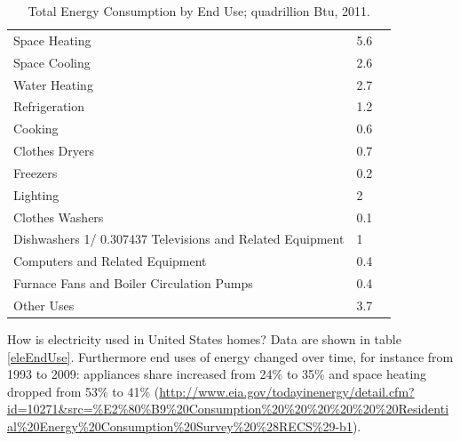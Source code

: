 \documentclass[10pt, letterpaper]{article}
\begin{document}
\begin{spacing}{1.0}




\begin{table}[H]\centering\footnotesize
\caption{\label{freq_im_god} Total Energy Consumption by End Use; quadrillion
  Btu, 2011.}
\begin{tabular}{lll}   \hline 
Space Heating&	5.6\\
Space Cooling&	2.6\\
Water Heating&	2.7\\
Refrigeration&	1.2\\
Cooking&	0.6\\
Clothes Dryers&	0.7\\
Freezers&	0.2\\
Lighting&	2\\
Clothes Washers&	0.1\\
Dishwashers 1/	0.307437
Televisions and Related Equipment&	1\\
Computers and Related Equipment &	0.4\\
Furnace Fans and Boiler Circulation Pumps&	0.4\\
Other Uses&	3.7\\\hline
\end{tabular}\end{table}

How is electricity used in United States homes? %
Data are shown in table
\ref{eleEndUse}. Furthermore end uses of energy changed over time, for instance
 from 1993 to 2009: appliances share increased from 24\% to 35\% and space
 heating dropped from 53\% to 41\%
 (\url{http://www.eia.gov/todayinenergy/detail.cfm?id=10271&src=%E2%80%B9%20Consumption%20%20%20%20%20%20Residential%20Energy%20Consumption%20Survey%20%28RECS%29-b1}). 



\end{spacing}
\end{document}
